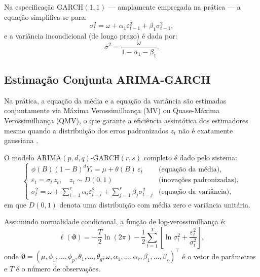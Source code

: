 Na especificação GARCH$(1,1)$ --- amplamente empregada na
prática \cite{bollerslev1986,tsay2010} --- a equação simplifica-se para:
%
\begin{equation}
    \label{eq:garch11}
    \sigma_t^2 = \omega + \alpha_1 \varepsilon_{t-1}^2
    + \beta_1 \sigma_{t-1}^2,
\end{equation}
%
e a variância incondicional (de longo prazo) é dada por:
%
\begin{equation}
    \label{eq:var_incond}
    \bar{\sigma}^2 = \frac{\omega}{1 - \alpha_1 - \beta_1}.
\end{equation}

\subsection{Estimação Conjunta ARIMA-GARCH}
\label{subsec:arima_garch_conjunto}

Na prática, a equação da média e a equação da variância são estimadas
conjuntamente via Máxima Verossimilhança (MV) ou Quase-Máxima Verossimilhança
(QMV), o que garante a eficiência assintótica dos estimadores mesmo quando a
distribuição dos erros padronizados $z_t$ não é exatamente
gaussiana \cite{bollerslev1992}.

O modelo ARIMA$(p,d,q)$-GARCH$(r,s)$ completo é dado pelo sistema:
%
\begin{equation}
    \label{eq:arima_garch}
    \begin{cases}
        \phi(B)(1-B)^d Y_t = \mu + \theta(B)\,\varepsilon_t
        & \text{(equação da média)},\\[6pt]
        \varepsilon_t = \sigma_t\,z_t,\quad z_t \sim D(0,1)
        & \text{(inovações padronizadas)},\\[6pt]
        \sigma_t^2 = \omega + \displaystyle\sum_{i=1}^{r}\alpha_i\varepsilon_{t-i}^2
        + \sum_{j=1}^{s}\beta_j\sigma_{t-j}^2
        & \text{(equação da variância)},
    \end{cases}
\end{equation}
%
em que $D(0,1)$ denota uma distribuição com média zero e variância
unitária.

Assumindo normalidade condicional, a função de log-verossimilhança é:
%
\begin{equation}
    \label{eq:loglik}
    \ell(\bm{\vartheta}) =
    -\frac{T}{2}\ln(2\pi)
    - \frac{1}{2}\sum_{t=1}^{T}
    \left[\ln\sigma_t^2 +
    \frac{\varepsilon_t^2}{\sigma_t^2}\right],
\end{equation}
%
onde $\bm{\vartheta} = (\mu, \phi_1,\ldots,\phi_p,
\theta_1,\ldots,\theta_q, \omega, \alpha_1,\ldots,\alpha_r,
\beta_1,\ldots,\beta_s)^\top$ é o vetor de parâmetros e $T$ é o número de
observações.

